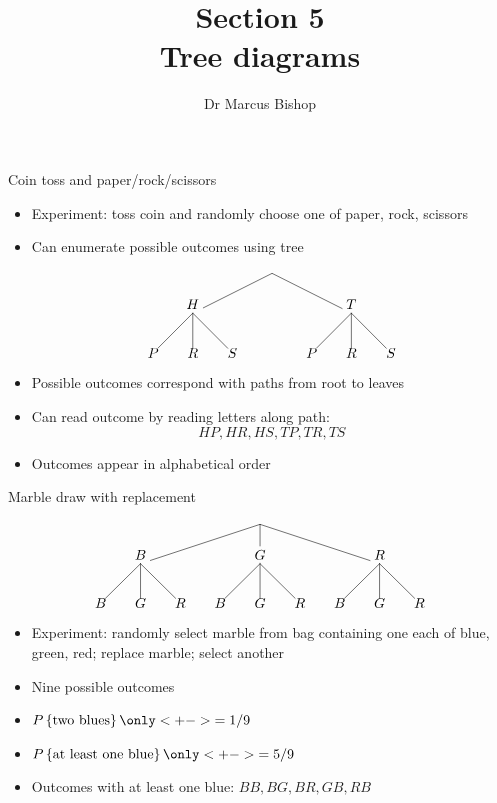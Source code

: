\documentclass[handout]{beamer}
\title[\S5]{Section 5\\Tree diagrams}
\author{Dr Marcus Bishop}
\theoremstyle{definition}
\begin{document}
\begin{frame}\titlepage\end{frame}
\LogoOff

\begin{frame}{Coin toss and paper/rock/scissors}
\begin{itemize}
\item Experiment: toss coin \alert{and} randomly choose
one of paper, rock, scissors
\item Can enumerate possible outcomes using tree
\[\begin{xy}<1cm,0cm>:
(0,0)="0";
(-2,-1)="-21";
(2,-1)="21";
"0";"-21"*+!D{H}**\dir{-};
"0";"21"*+!D{T}**\dir{-};
"-21";(-3,-2)*{P}**\dir{-};
"-21";(-2,-2)*{R}**\dir{-};
"-21";(-1,-2)*{S}**\dir{-};
"21";(1,-2)*{P}**\dir{-};
"21";(2,-2)*{R}**\dir{-};
"21";(3,-2)*{S}**\dir{-};
\end{xy}\]
\item Possible outcomes correspond with paths from root to leaves
\item Can read outcome by reading letters along path:
\[HP,HR,HS,TP,TR,TS\]
\item Outcomes appear in alphabetical order
\end{itemize}
\end{frame}

\begin{frame}{Marble draw with replacement}
\[\begin{xy}<1cm,0cm>:
(0,0)="0";
(-3,-1)="-31";
(0,-1)="01";
(3,-1)="31";
"0";"-31"*+!D{B}**\dir{-};
"0";"01"*+!D{G}**\dir{-};
"0";"31"*+!D{R}**\dir{-};
"-31";(-4,-2)*{B}**\dir{-};
"-31";(-3,-2)*{G}**\dir{-};
"-31";(-2,-2)*{R}**\dir{-};
"01";(-1,-2)*{B}**\dir{-};
"01";(0,-2)*{G}**\dir{-};
"01";(1,-2)*{R}**\dir{-};
"31";(2,-2)*{B}**\dir{-};
"31";(3,-2)*{G}**\dir{-};
"31";(4,-2)*{R}**\dir{-};
\end{xy}\]
\begin{itemize}
\item Experiment: randomly select marble from bag
containing one each of blue, green, red;
\alert{replace marble}; select another
\item Nine possible outcomes
\item $P\left\{\text{two blues}\right\}
\only<+->{=1/9}$
\item $P\left\{\text{at least one blue}\right\}
\only<+->{=5/9}$
\item Outcomes with at least one blue:
$BB,BG,BR,GB,RB$
\end{itemize}
\end{frame}
\end{document}
